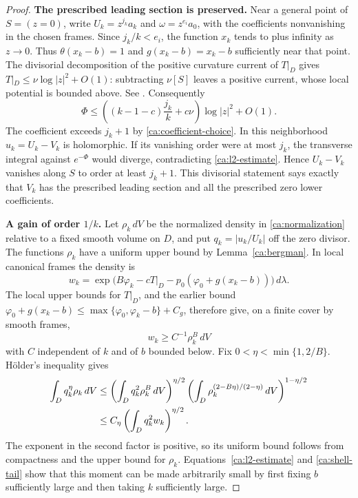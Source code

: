 \begin{proof}
\smallskip\noindent\textbf{The prescribed leading section is preserved.}\enspace
Near a general point of \(S=(z=0)\), write
\(U_k=z^{j_k}a_k\) and \(\omega=z^{e_i}a_0\), with the
coefficients nonvanishing in the chosen frames.  Since
\(j_k/k<e_i\), the function \(x_k\) tends to plus infinity as
\(z\to0\).  Thus \(\theta(x_k-b)=1\) and
\(g(x_k-b)=x_k-b\) sufficiently near that point.
The divisorial decomposition of the positive curvature current of
\(T|_D\) gives
\(T|_D\leq\nu\log|z|^2+O(1)\): subtracting
\(\nu[S]\) leaves a positive current, whose local potential is
bounded above.  See \cite[Chapter~III, Proposition~8.16]{DemaillyCADG}.
Consequently
\begin{equation}\label{ca:jet-weight-order}
 \Phi\leq\left((k-1-c)\frac{j_k}{k}+c\nu\right)
                      \log|z|^2+O(1).
\end{equation}
The coefficient exceeds \(j_k+1\) by
\eqref{ca:coefficient-choice}.  In this neighborhood
\(u_k=U_k-V_k\) is holomorphic.  If its vanishing order were at
most \(j_k\), the transverse integral against \(e^{-\Phi}\)
would diverge, contradicting \eqref{ca:l2-estimate}.  Hence
\(U_k-V_k\) vanishes along \(S\) to order at least \(j_k+1\).
This divisorial statement says exactly that \(V_k\) has the
prescribed leading section and all the prescribed zero lower
coefficients.

\smallskip\noindent\textbf{A gain of order \(1/k\).}\enspace
Let \(\rho_k\,dV\) be the normalized density in
\eqref{ca:normalization} relative to a fixed smooth volume on
\(D\), and put \(q_k=|u_k/U_k|\) off the zero divisor.
The functions \(\rho_k\) have a uniform upper bound by
Lemma~\ref{ca:bergman}. In local canonical frames the density is
\[
 w_k=\exp\bigl(B\varphi_k-cT|_D
             -p_0(\varphi_0+g(x_k-b))\bigr)\,d\lambda.
\]
The local upper bounds for \(T|_D\), and the earlier bound
$\varphi_0+g(x_k-b)\leq\max\{\varphi_0,\varphi_k-b\}+C_g$,
therefore give, on a finite cover by smooth frames,
\begin{equation}\label{ca:density-lower-bound}
 w_k\geq C^{-1}\rho_k^B\,dV
\end{equation}
with \(C\) independent of \(k\) and of \(b\) bounded below.
Fix \(0<\eta<\min\{1,2/B\}\).  H\"older's inequality gives
\begin{align}
 \int_D q_k^\eta\rho_k\,dV
 &\leq
 \left(\int_D q_k^2\rho_k^B\,dV\right)^{\eta/2}
 \left(\int_D
       \rho_k^{(2-B\eta)/(2-\eta)}\,dV\right)^{1-\eta/2}
                                                        \label{ca:holder}\\
 &\leq C_\eta
       \left(\int_D q_k^2w_k\right)^{\eta/2}.\notag
\end{align}
The exponent in the second factor is positive, so its uniform
bound follows from compactness and the upper bound for \(\rho_k\).
Equations~\eqref{ca:l2-estimate} and \eqref{ca:shell-tail} show
that this moment can be made arbitrarily small by first fixing
\(b\) sufficiently large and then taking \(k\) sufficiently large.


\end{proof}
